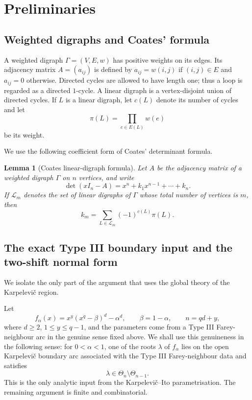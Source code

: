 \documentclass[11pt]{article}
\numberwithin{equation}{section}
\newtheorem{lemma}[theorem]{Lemma}
\begin{document}
\section{Preliminaries}

\subsection{Weighted digraphs and Coates' formula}

A weighted digraph $\Gamma=(V,E,w)$ has positive weights on its edges. Its
adjacency matrix $A=(a_{ij})$ is defined by $a_{ij}=w(i,j)$ if $(i,j)\in E$
and $a_{ij}=0$ otherwise. Directed cycles are allowed to have length one; thus
a loop is regarded as a directed $1$-cycle. A linear digraph is a
vertex-disjoint union of directed cycles. If $L$ is a linear digraph, let
$c(L)$ denote its number of cycles and let
\[
        \pi(L)=\prod_{e\in E(L)}w(e)
\]
be its weight.

We use the following coefficient form of Coates' determinant formula.

\begin{lemma}[Coates linear-digraph formula]
Let $A$ be the adjacency matrix of a weighted digraph $\Gamma$ on $n$
vertices, and write
\[
        \det(xI_n-A)=x^n+k_1x^{n-1}+\cdots+k_n.
\]
If $\mathcal L_m$ denotes the set of linear digraphs of $\Gamma$ whose total
number of vertices is $m$, then
\[
        k_m=\sum_{L\in\mathcal L_m}(-1)^{c(L)}\pi(L).
\]
\end{lemma}

\subsection{The exact Type III boundary input and the two-shift normal form}

We isolate the only part of the argument that uses the global theory of the
Karpelevi\v{c} region.

Let
\[
        f_\alpha(x)=x^y(x^q-\beta)^d-\alpha^d,
        \qquad \beta=1-\alpha,
        \qquad n=qd+y,
\]
where $d\ge2$, $1\le y\le q-1$, and the parameters come from a Type III
Farey-neighbour arc in the genuine sense fixed above. We shall use this
genuineness in the following sense: for $0<\alpha<1$, one of the roots
$\lambda$ of $f_\alpha$ lies on the open Karpelevi\v{c} boundary arc
associated with the Type III Farey-neighbour data and satisfies
\[
        \lambda\in\Theta_n\setminus\Theta_{n-1}.
\]
This is the only analytic input from the Karpelevi\v{c}--Ito parametrisation.
The remaining argument is finite and combinatorial.
\end{document}
